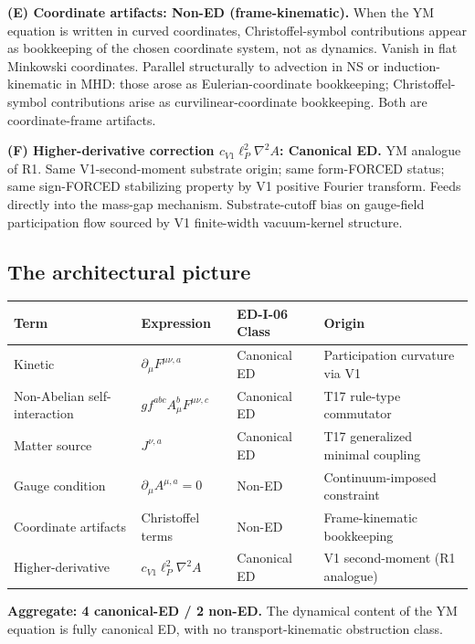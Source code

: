 \documentclass[11pt,a4paper]{article}
\begin{document}
\textbf{(E) Coordinate artifacts: Non-ED (frame-kinematic).} When the YM equation is written in curved coordinates, Christoffel-symbol contributions appear as bookkeeping of the chosen coordinate system, not as dynamics. Vanish in flat Minkowski coordinates. Parallel structurally to advection in NS or induction-kinematic in MHD: those arose as Eulerian-coordinate bookkeeping; Christoffel-symbol contributions arise as curvilinear-coordinate bookkeeping. Both are coordinate-frame artifacts.

\textbf{(F) Higher-derivative correction $c_{V1} \ell_P^{2} \nabla^{2} A$: Canonical ED.} YM analogue of R1. Same V1-second-moment substrate origin; same form-FORCED status; same sign-FORCED stabilizing property by V1 positive Fourier transform. Feeds directly into the mass-gap mechanism. Substrate-cutoff bias on gauge-field participation flow sourced by V1 finite-width vacuum-kernel structure.

\subsection{The architectural picture}

\begin{center}
\begin{tabular}{llll}
\toprule
\textbf{Term} & \textbf{Expression} & \textbf{ED-I-06 Class} & \textbf{Origin} \\
\midrule
Kinetic & $\partial_\mu F^{\mu\nu,a}$ & Canonical ED & Participation curvature via V1 \\
Non-Abelian self-interaction & $g f^{abc} A_\mu^b F^{\mu\nu,c}$ & Canonical ED & T17 rule-type commutator \\
Matter source & $J^{\nu,a}$ & Canonical ED & T17 generalized minimal coupling \\
Gauge condition & $\partial_\mu A^{\mu,a} = 0$ & Non-ED & Continuum-imposed constraint \\
Coordinate artifacts & Christoffel terms & Non-ED & Frame-kinematic bookkeeping \\
Higher-derivative & $c_{V1} \ell_P^{2} \nabla^{2} A$ & Canonical ED & V1 second-moment (R1 analogue) \\
\bottomrule
\end{tabular}
\end{center}

\textbf{Aggregate: 4 canonical-ED / 2 non-ED.} The dynamical content of the YM equation is fully canonical ED, with no transport-kinematic obstruction class.
\end{document}
